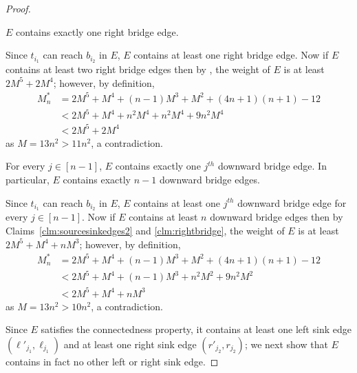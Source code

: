 \begin{proof}
\begin{claim}
\label{clm:rightbridge}
$E$ contains exactly one right bridge edge.
\end{claim}

\begin{claimproof}
Since $t_{i_1}$ can reach $b_{i_2}$ in $E$, $E$ contains at least one right bridge edge. Now if $E$ contains at least two right bridge edges then by , the weight of $E$ is at least $2M^5 + 2M^4$; however, by definition,
\begin{equation*}
\begin{split}
M_n^* &= 2M^5 + M^4 + (n-1)M^3 + M^2 + (4n+1)(n+1) - 12\\
& < 2M^5 + M^4 + n^2M^4 + n^2M^4 + 9n^2M^4 \\
& < 2M^5 + 2M^4
\end{split}
\end{equation*}
as $M = 13n^2 > 11n^2$, a contradiction.
\end{claimproof}

\begin{claim}
\label{clm:downwardbridges}
For every $j \in [n-1]$, $E$ contains exactly one $j^{th}$ downward bridge edge. In particular, $E$ contains exactly $n-1$ downward bridge edges.
\end{claim}

\begin{claimproof}
Since $t_{i_1}$ can reach $b_{i_2}$ in $E$, $E$ contains at least one $j^{th}$ downward bridge edge for every $j \in [n-1]$. Now if $E$ contains at least $n$ downward bridge edges then by Claims~\ref{clm:sourcesinkedges2} and \ref{clm:rightbridge}, the weight of $E$ is at least $2M^5 + M^4 + nM^3$; however, by definition,
\begin{equation*}
\begin{split}
M_n^* &=  2M^5 + M^4 + (n-1)M^3 + M^2 + (4n+1)(n+1) - 12\\
& < 2M^5 + M^4 + (n-1)M^3 + n^2M^2 + 9n^2M^2 \\
& < 2M^5 + M^4 + nM^3
\end{split}
\end{equation*}
as $M = 13n^2 > 10n^2$, a contradiction.
\end{claimproof}

Since $E$ satisfies the connectedness property, it contains at least one left sink edge $(\ell'_{j_1},\ell_{j_1})$ and at least one right sink edge $(r'_{j_2},r_{j_2})$; we next show that $E$ contains in fact no other left or right sink edge.


\end{proof}
